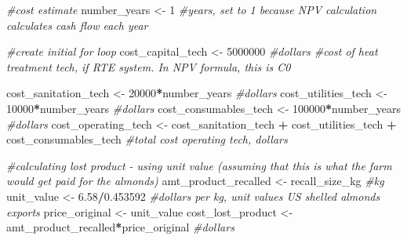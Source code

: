 \documentclass[
]{article}
\newenvironment{Shaded}{\begin{snugshade}}{\end{snugshade}}
\newcommand{\CommentTok}[1]{\textcolor[rgb]{0.56,0.35,0.01}{\textit{#1}}}
\newcommand{\DecValTok}[1]{\textcolor[rgb]{0.00,0.00,0.81}{#1}}
\newcommand{\FloatTok}[1]{\textcolor[rgb]{0.00,0.00,0.81}{#1}}
\newcommand{\NormalTok}[1]{#1}
\newcommand{\OtherTok}[1]{\textcolor[rgb]{0.56,0.35,0.01}{#1}}
\newcommand{\SpecialCharTok}[1]{\textcolor[rgb]{0.81,0.36,0.00}{\textbf{#1}}}
\begin{document}
\begin{Shaded}
\begin{Highlighting}[]
\CommentTok{\#cost estimate}
\NormalTok{number\_years }\OtherTok{\textless{}{-}} \DecValTok{1} \CommentTok{\#years, set to 1 because NPV calculation calculates cash flow each year}

\CommentTok{\#create initial for loop}
\NormalTok{cost\_capital\_tech }\OtherTok{\textless{}{-}} \DecValTok{5000000} \CommentTok{\#dollars \#cost of heat treatment tech, if RTE system. In NPV formula, this is C0}

\NormalTok{cost\_sanitation\_tech }\OtherTok{\textless{}{-}} \DecValTok{20000}\SpecialCharTok{*}\NormalTok{number\_years }\CommentTok{\#dollars}
\NormalTok{cost\_utilities\_tech }\OtherTok{\textless{}{-}} \DecValTok{10000}\SpecialCharTok{*}\NormalTok{number\_years }\CommentTok{\#dollars}
\NormalTok{cost\_consumables\_tech }\OtherTok{\textless{}{-}} \DecValTok{100000}\SpecialCharTok{*}\NormalTok{number\_years }\CommentTok{\#dollars}
\NormalTok{cost\_operating\_tech }\OtherTok{\textless{}{-}}\NormalTok{ cost\_sanitation\_tech }\SpecialCharTok{+}\NormalTok{ cost\_utilities\_tech }\SpecialCharTok{+}\NormalTok{ cost\_consumables\_tech }\CommentTok{\#total cost operating tech, dollars}

\CommentTok{\#calculating lost product {-} using unit value (assuming that this is what the farm would get paid for the almonds)}
\NormalTok{amt\_product\_recalled }\OtherTok{\textless{}{-}}\NormalTok{  recall\_size\_kg  }\CommentTok{\#kg}
\NormalTok{unit\_value }\OtherTok{\textless{}{-}} \FloatTok{6.58}\SpecialCharTok{/}\FloatTok{0.453592}  \CommentTok{\#dollars per kg, unit values US shelled almonds exports}
\NormalTok{price\_original }\OtherTok{\textless{}{-}}\NormalTok{ unit\_value}
\NormalTok{cost\_lost\_product }\OtherTok{\textless{}{-}}\NormalTok{ amt\_product\_recalled}\SpecialCharTok{*}\NormalTok{price\_original }\CommentTok{\#dollars}


\end{Highlighting}
\end{Shaded}
\end{document}
